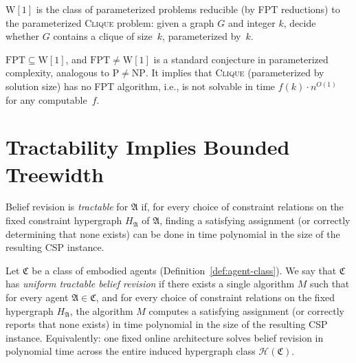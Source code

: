 \documentclass[runningheads]{llncs}
\begin{document}
\begin{definition}[{$\mathrm{W}[1]$}]\label{def:w1}
$\mathrm{W}[1]$ is the class of parameterized problems reducible (by FPT reductions) to the parameterized \textsc{Clique} problem: given a graph $G$ and integer $k$, decide whether $G$ contains a clique of size~$k$, parameterized by~$k$.
\end{definition}

\begin{remark}\label{rem:fpt-conj}
$\mathrm{FPT} \subseteq \mathrm{W}[1]$, and $\mathrm{FPT} \neq \mathrm{W}[1]$ is a standard conjecture in parameterized complexity, analogous to $\mathrm{P} \neq \mathrm{NP}$.
It implies that \textsc{Clique} (parameterized by solution size) has no FPT algorithm, i.e., is not solvable in time $f(k) \cdot n^{O(1)}$ for any computable~$f$.
\end{remark}

\section{Tractability Implies Bounded Treewidth}\label{sec:tractability}

\begin{definition}\label{def:tractable-revision}
Belief revision is \emph{tractable} for $\mathfrak{A}$ if, for every choice of constraint relations on the fixed constraint hypergraph $H_{\mathfrak{A}}$ of $\mathfrak{A}$, finding a satisfying assignment (or correctly determining that none exists) can be done in time polynomial in the size of the resulting CSP instance.
\end{definition}

\begin{definition}\label{def:uniform-tractable-revision}
Let $\mathfrak{C}$ be a class of embodied agents (Definition~\ref{def:agent-class}).
We say that $\mathfrak{C}$ has \emph{uniform tractable belief revision} if there exists a single algorithm $M$ such that for every agent $\mathfrak{A} \in \mathfrak{C}$, and for every choice of constraint relations on the fixed hypergraph $H_{\mathfrak{A}}$, the algorithm $M$ computes a satisfying assignment (or correctly reports that none exists) in time polynomial in the size of the resulting CSP instance.
Equivalently: one fixed online architecture solves belief revision in polynomial time across the entire induced hypergraph class $\mathcal{H}(\mathfrak{C})$.
\end{definition}
\end{document}

